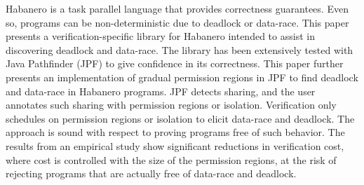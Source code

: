 Habanero is a task parallel language that provides correctness guarantees. Even
so, programs can be non-deterministic due to deadlock or data-race. This paper
presents a verification-specific library for Habanero intended to assist in
discovering deadlock and data-race. The library has been extensively tested with
Java Pathfinder (JPF) to give confidence in its correctness. This paper further presents an
implementation of gradual permission regions in JPF to find deadlock and
data-race in Habanero programs. JPF detects sharing, and the user annotates such
sharing with permission regions or isolation. Verification only schedules on
permission regions or isolation to elicit data-race and deadlock. The approach
is sound with respect to proving programs free of such behavior. The results
from an empirical study show significant reductions in verification cost, where
cost is controlled with the size of the permission regions, at the risk of
rejecting programs that are actually free of data-race and deadlock.
